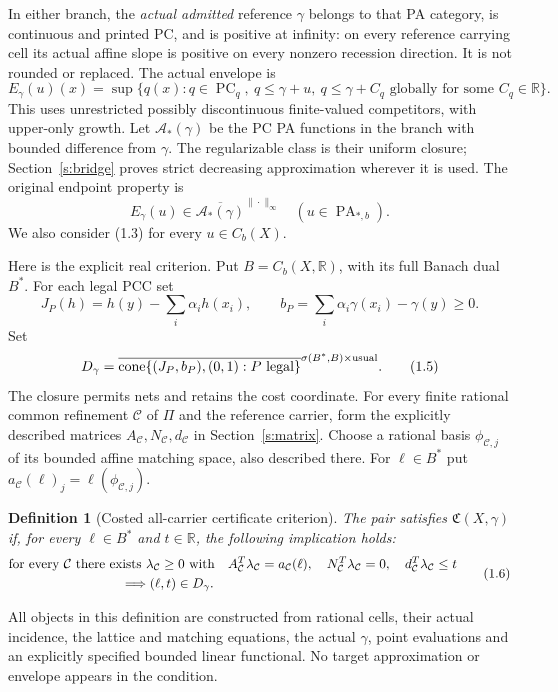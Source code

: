 \documentclass[11pt]{article}
\newtheorem{definition}[theorem]{Definition}
\newcommand{\R}{\mathbb R}\newcommand{\Q}{\mathbb Q}\newcommand{\Z}{\mathbb Z}
\newcommand{\PC}{\operatorname{PC}_q}\newcommand{\PA}{\operatorname{PA}}
\begin{document}
In either branch, the \emph{actual admitted} reference $\gamma$ belongs to that PA category, is continuous and printed PC, and is positive at infinity: on every reference carrying cell its actual affine slope is positive on every nonzero recession direction. It is not rounded or replaced. The actual envelope is
\[
 E_\gamma(u)(x)=\sup\{q(x):q\in\PC,\ q\leq\gamma+u,\
 q\leq\gamma+C_q\text{ globally for some }C_q\in\R\}.                \tag{1.2}
\]
This uses unrestricted possibly discontinuous finite-valued competitors, with upper-only growth. Let $\mathcal A_*(\gamma)$ be the PC PA functions in the branch with bounded difference from $\gamma$. The regularizable class is their uniform closure; Section~\ref{s:bridge} proves strict decreasing approximation wherever it is used. The original endpoint property is
\[
 E_\gamma(u)\in\overline{\mathcal A_*(\gamma)}^{\|\cdot\|_\infty}
 \quad(u\in\PA_{*,b}).                                             \tag{1.3}
\]
We also consider (1.3) for every $u\in C_b(X)$.

Here is the explicit real criterion. Put $B=C_b(X,\R)$, with its full Banach dual $B^*$. For each legal PCC set
\[
 J_P(h)=h(y)-\sum_i\alpha_i h(x_i),\qquad
 b_P=\sum_i\alpha_i\gamma(x_i)-\gamma(y)\geq0.                        \tag{1.4}
\]
Set
\[
 D_\gamma=\overline{\operatorname{cone}\{(J_P,b_P),(0,1):P\text{ legal}\}}
 ^{\sigma(B^*,B)\times\mathrm{usual}}.                              \tag{1.5}
\]
The closure permits nets and retains the cost coordinate. For every finite rational common refinement $\mathcal C$ of $\Pi$ and the reference carrier, form the explicitly described matrices $A_\mathcal C,N_\mathcal C,d_\mathcal C$ in Section~\ref{s:matrix}. Choose a rational basis $\phi_{\mathcal C,j}$ of its bounded affine matching space, also described there. For $\ell\in B^*$ put $a_\mathcal C(\ell)_j=\ell(\phi_{\mathcal C,j})$.

\begin{definition}[Costed all-carrier certificate criterion]\label{d:criterion}
The pair satisfies $\mathfrak C(X,\gamma)$ if, for every $\ell\in B^*$ and $t\in\R$, the following implication holds:
\[
\begin{split}
 &\text{for every }\mathcal C\text{ there exists }\lambda_\mathcal C\geq0
 \text{ with}\quad A_\mathcal C^T\lambda_\mathcal C=a_\mathcal C(\ell),\quad
 N_\mathcal C^T\lambda_\mathcal C=0,\quad
 d_\mathcal C^T\lambda_\mathcal C\leq t\\
 &\hspace{30mm}\Longrightarrow (\ell,t)\in D_\gamma .
\end{split}\tag{1.6}
\]
\end{definition}
All objects in this definition are constructed from rational cells, their actual incidence, the lattice and matching equations, the actual $\gamma$, point evaluations and an explicitly specified bounded linear functional. No target approximation or envelope appears in the condition.
\end{document}
